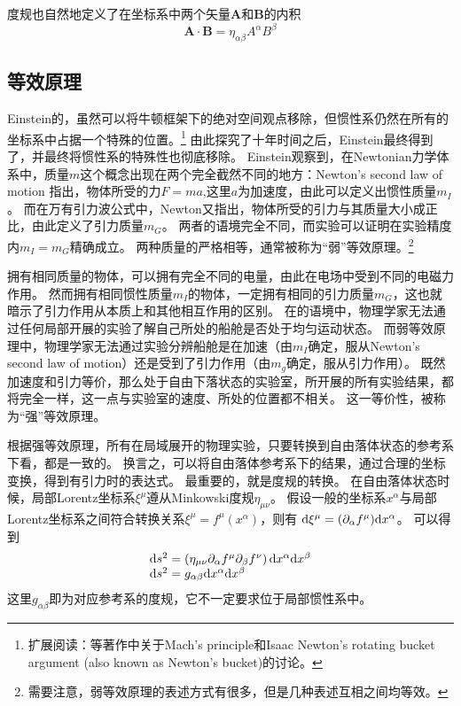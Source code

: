 度规也自然地定义了在坐标系中两个矢量$\mathbf{A}$和$\mathbf{B}$的内积
\begin{equation}\label{eq:InnerProduct}
  \mathbf{A}\cdot\mathbf{B}= \eta_ {\alpha \beta}A^\alpha B^\beta
\end{equation}

\subsection{等效原理}
Einstein的\SR，虽然可以将牛顿框架下的绝对空间观点移除，但惯性系仍然在所有的坐标系中占据一个特殊的位置。\footnote{扩展阅读：\cite{RindlerGR}等著作中关于Mach's principle和Isaac Newton's rotating bucket argument (also known as Newton's bucket)的讨论。}
由此探究了十年时间之后，Einstein最终得到了\GR ，并最终将惯性系的特殊性也彻底移除。
Einstein观察到，在Newtonian力学体系中，质量$m$这个概念出现在两个完全截然不同的地方：Newton's second law of motion 指出，物体所受的力$F=ma$,这里$a$为加速度，由此可以定义出惯性质量$m_I$。
而在万有引力波公式中，Newton又指出，物体所受的引力与其质量大小成正比，由此定义了引力质量$m_G$。
两者的语境完全不同，而实验可以证明在实验精度内$m_I = m_G$精确成立。
两种质量的严格相等，通常被称为“弱”等效原理。\footnote{需要注意，弱等效原理的表述方式有很多，但是几种表述互相之间均等效。}

拥有相同质量的物体，可以拥有完全不同的电量，由此在电场中受到不同的电磁力作用。
然而拥有相同惯性质量$m_I$的物体，一定拥有相同的引力质量$m_G$，这也就暗示了引力作用从本质上和其他相互作用的区别。
在\SR 的语境中，物理学家无法通过任何局部开展的实验了解自己所处的船舱是否处于均匀运动状态。
而弱等效原理中，物理学家无法通过实验分辨船舱是在加速（由$m_I$确定，服从Newton's second law of motion）还是受到了引力作用（由$m_g$确定，服从引力作用）。
既然加速度和引力等价，那么处于自由下落状态的实验室，所开展的所有{}实验结果，都将完全一样，这一点与实验室的速度、所处的位置都不相关。
这一等价性，被称为“强”等效原理。

根据强等效原理，所有在局域展开的物理实验，只要转换到自由落体状态的参考系下看，都是一致的。
换言之，可以将自由落体参考系下的结果，通过合理的坐标变换，得到有引力时的表达式。
最重要的，就是度规的转换。
在自由落体状态时候，局部Lorentz坐标系$\xi^\mu$遵从Minkowski度规$\eta_{\mu\nu}$。
假设一般的坐标系$x^\alpha$与局部Lorentz坐标系之间符合转换关系$\xi ^\mu= f^\mu (x^\alpha)$，则有 ${\rm d} \xi ^\mu = (\partial_\alpha f^\mu) {\rm d}x^\alpha$。
可以得到 \begin{equation}\label{eq:STinterval_diff_GR} \begin{array}{r@{}l}
  {\rm d}s^2 &{} = \left( \eta_ {\mu \nu} \partial_\alpha f^\mu \partial_\beta f^\nu\right){\rm d} x^\alpha {\rm d} x^\beta\\
  {\rm d}s^2 &{} = g_{\alpha\beta} {\rm d} x^\alpha {\rm d} x^\beta
\end{array}
\end{equation}
这里$g_{\alpha\beta}$即为对应参考系的度规，它不一定要求位于局部惯性系中。


